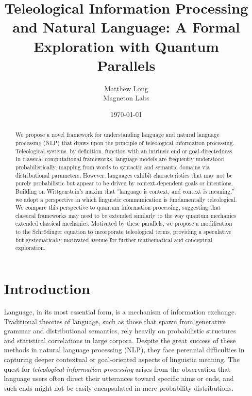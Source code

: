 \documentclass[11pt]{article}
\begin{document}
\title{\textbf{Teleological Information Processing and Natural Language: A Formal Exploration with Quantum Parallels}}
\author{Matthew Long \\
Magneton Labs}
\date{\today}
\maketitle

\begin{abstract}
We propose a novel framework for understanding language and natural language processing (NLP) that draws upon the principle of teleological information processing. Teleological systems, by definition, function with an intrinsic end or goal-directedness. In classical computational frameworks, language models are frequently understood probabilistically, mapping from words to syntactic and semantic domains via distributional parameters. However, languages exhibit characteristics that may not be purely probabilistic but appear to be driven by context-dependent goals or intentions. Building on Wittgenstein's maxim that ``language is context, and context is meaning,'' we adopt a perspective in which linguistic communication is fundamentally teleological. We compare this perspective to quantum information processing, suggesting that classical frameworks may need to be extended similarly to the way quantum mechanics extended classical mechanics. Motivated by these parallels, we propose a modification to the Schr\"odinger equation to incorporate teleological terms, providing a speculative but systematically motivated avenue for further mathematical and conceptual exploration.
\end{abstract}

\tableofcontents

\section{Introduction}
Language, in its most essential form, is a mechanism of information exchange. Traditional theories of language, such as those that spawn from generative grammar and distributional semantics, rely heavily on probabilistic structures and statistical correlations in large corpora. Despite the great success of these methods in natural language processing (NLP), they face perennial difficulties in capturing deeper contextual or goal-oriented aspects of linguistic meaning. The quest for \emph{teleological information processing} arises from the observation that language users often direct their utterances toward specific aims or ends, and such ends might not be easily encapsulated in mere probability distributions.
\end{document}
